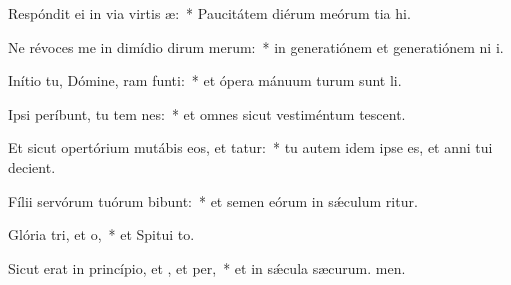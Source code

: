 \item Respóndit ei in via virtis æ:~* Paucitátem diérum meórum tia hi.
\item Ne révoces me in dimídio dirum merum:~* in generatiónem et generatiónem ni i.
\item Inítio tu, Dómine, ram funti:~* et ópera mánuum turum sunt li.
\item Ipsi períbunt, tu tem nes:~* et omnes sicut vestiméntum tescent.
\item Et sicut opertórium mutábis eos, et tatur:~* tu autem idem ipse es, et anni tui  decient.
\item Fílii servórum tuórum bibunt:~* et semen eórum in sǽculum ritur.
\item Glória tri, et o,~* et Spitui to.
\item Sicut erat in princípio, et , et per,~* et in sǽcula sæcurum. men.
